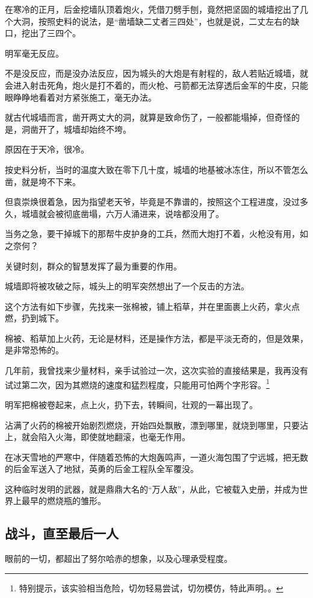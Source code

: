 \begin{multicols}{\theparacolNo}
		在寒冷的正月，后金挖墙队顶着炮火，凭借刀劈手刨，竟然把坚固的城墙挖出了几个大洞，按照史料的说法，是“凿墙缺二丈者三四处”，也就是说，二丈左右的缺口，挖出了三四个。

		明军毫无反应。

		不是没反应，而是没办法反应，因为城头的大炮是有射程的，敌人若贴近城墙，就会进入射击死角，炮火是打不着的，而火枪、弓箭都无法穿透后金军的牛皮，只能眼睁睁地看着对方紧张施工，毫无办法。

		就古代城墙而言，凿开两丈大的洞，就算是致命伤了，一般都能塌掉，但奇怪的是，洞凿开了，城墙却始终不垮。

		原因在于天冷，很冷。

		按史料分析，当时的温度大致在零下几十度，城墙的地基被冰冻住，所以不管怎么凿，就是垮不下来。

		但袁崇焕很着急，因为指望老天爷，毕竟是不靠谱的，按照这个工程进度，没过多久，城墙就会被彻底凿塌，六万人涌进来，说啥都没用了。

		当务之急，要干掉城下的那帮牛皮护身的工兵，然而大炮打不着，火枪没有用，如之奈何？

		关键时刻，群众的智慧发挥了最为重要的作用。

		城墙即将被攻破之际，城头上的明军突然想出了一个反击的方法。

		这个方法有如下步骤，先找来一张棉被，铺上稻草，并在里面裹上火药，拿火点燃，扔到城下。

		棉被、稻草加上火药，无论是材料，还是操作方法，都是平淡无奇的，但是效果，是非常恐怖的。

		几年前，我曾找来少量材料，亲手试验过一次，这次实验的直接结果是，我再没有试过第二次，因为其燃烧的速度和猛烈程度，只能用可怕两个字形容。\footnote{特别提示，该实验相当危险，切勿轻易尝试，切勿模仿，特此声明。。}

		明军把棉被卷起来，点上火，扔下去，转瞬间，壮观的一幕出现了。

		沾满了火药的棉被开始剧烈燃烧，开始四处飘散，漂到哪里，就烧到哪里，只要沾上，就会陷入火海，即使就地翻滚，也毫无作用。

		在冰天雪地的严寒中，伴随着恐怖的大炮轰鸣声，一道火海包围了宁远城，把无数的后金军送入了地狱，英勇的后金工程队全军覆没。

		这种临时发明的武器，就是鼎鼎大名的“万人敌”，从此，它被载入史册，并成为世界上最早的燃烧瓶的雏形。

		\subsection{战斗，直至最后一人}
		眼前的一切，都超出了努尔哈赤的想象，以及心理承受程度。


\end{multicols}

